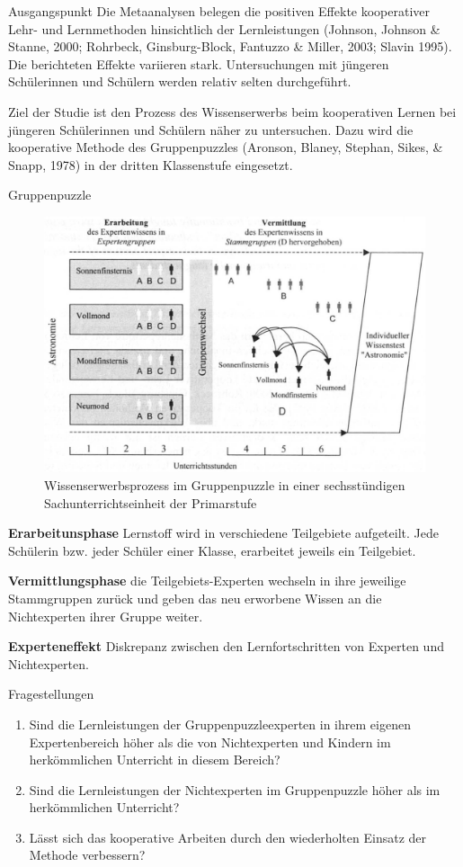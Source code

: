 \begin{block}{Ausgangspunkt}
Die Metaanalysen belegen die positiven Effekte kooperativer Lehr- und Lernmethoden hinsichtlich der Lernleistungen (Johnson, Johnson \& Stanne, 2000; Rohrbeck, Ginsburg-Block, Fantuzzo \& Miller, 2003; Slavin 1995). Die berichteten Effekte variieren stark. Untersuchungen mit jüngeren Schülerinnen und Schülern werden relativ selten durchgeführt. 

Ziel der Studie ist den Prozess des Wissenserwerbs beim kooperativen Lernen bei jüngeren Schülerinnen und Schülern näher zu untersuchen. Dazu wird die kooperative Methode des Gruppenpuzzles (Aronson, Blaney, Stephan, Sikes, \& Snapp, 1978) in der dritten Klassenstufe eingesetzt.
\end{block}


\begin{block}{Gruppenpuzzle}

\begin{figure}
\includegraphics[width=0.67\linewidth]{experteneffekt.jpg}
\caption{Wissenserwerbsprozess im Gruppenpuzzle in einer sechsstündigen Sachunterrichtseinheit der Primarstufe}
\end{figure}

\textbf{Erarbeitunsphase} Lernstoff wird in verschiedene Teilgebiete aufgeteilt. Jede Schülerin bzw. jeder Schüler einer Klasse, erarbeitet jeweils ein Teilgebiet. 

\textbf{Vermittlungsphase} die Teilgebiets-Experten wechseln in ihre jeweilige Stammgruppen zurück und geben das neu erworbene Wissen an die Nichtexperten ihrer Gruppe weiter. 

\textbf{Experteneffekt} Diskrepanz zwischen den Lernfortschritten von Experten und Nichtexperten.  
\end{block}


\begin{alertblock}{Fragestellungen}
\begin{enumerate}
\item Sind die Lernleistungen der Gruppenpuzzleexperten in ihrem eigenen Expertenbereich höher als die von Nichtexperten und Kindern im herkömmlichen Unterricht in diesem Bereich?
\item Sind die Lernleistungen der Nichtexperten im Gruppenpuzzle höher als im herkömmlichen Unterricht?
\item Lässt sich das kooperative Arbeiten durch den wiederholten Einsatz der Methode verbessern?
\end{enumerate}
\end{alertblock}
